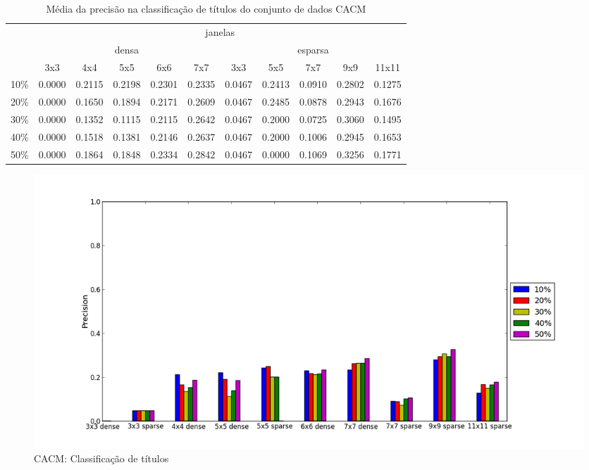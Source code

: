 \documentclass[a4paper,11pt]{article}
\begin{document}
  \begin{center}
    \begin{table}[p]
      \caption{Média da precisão na classificação de títulos do conjunto de dados CACM}
      \begin{tabular}{ l | c c c c c || c c c c c | }
        \cline{2-11}
        & \multicolumn{10}{|c|}{janelas} \\
        \cline{2-11}
        & \multicolumn{5}{c||}{densa} & \multicolumn{5}{c|}{esparsa} \\
        \cline{2-11}
        & 3x3 & 4x4 & 5x5 & 6x6 & 7x7 & 3x3 & 5x5 & 7x7 & 9x9 & 11x11 \\
        \hline
        \multicolumn{1}{|l|}{10\%}& 0.0000& 0.2115& 0.2198& 0.2301& 0.2335& 0.0467& 0.2413& 0.0910& 0.2802& 0.1275\\
        \multicolumn{1}{|l|}{20\%}& 0.0000& 0.1650& 0.1894& 0.2171& 0.2609& 0.0467& 0.2485& 0.0878& 0.2943& 0.1676\\
        \multicolumn{1}{|l|}{30\%}& 0.0000& 0.1352& 0.1115& 0.2115& 0.2642& 0.0467& 0.2000& 0.0725& 0.3060& 0.1495\\
        \multicolumn{1}{|l|}{40\%}& 0.0000& 0.1518& 0.1381& 0.2146& 0.2637& 0.0467& 0.2000& 0.1006& 0.2945& 0.1653\\
        \multicolumn{1}{|l|}{50\%}& 0.0000& 0.1864& 0.1848& 0.2334& 0.2842& 0.0467& 0.0000& 0.1069& 0.3256& 0.1771\\
        \hline  
      \end{tabular}
      \label{tab:cacm_precision_heading}
    \end{table}
  \end{center}
    
  \begin{figure}[p]
    \centerline{\includegraphics[width=1.2\textwidth]{assets/experiment_charts/cacm_TextRegion_heading_precision.png}}
    \caption{CACM: Classificação de títulos}
    \label{fig:cacm_TextRegion_heading_precision}
  \end{figure}
\end{document}
